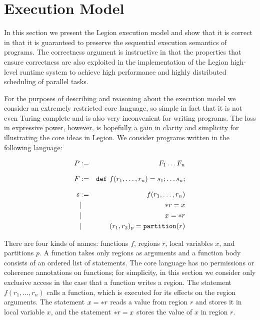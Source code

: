 
\section{Execution Model}
\label{sec:exec}

In this section we present the Legion execution model and show that
it is correct in that it is guaranteed to preserve the sequential
execution semantics of programs.  The correctness argument is
instructive in that the properties that ensure correctness are also
exploited in the implementation of the Legion high-level runtime
system to achieve high performance and highly distributed scheduling
of parallel tasks.

For the purposes of describing and reasoning about the
execution model we consider an extremely restricted core language, so
simple in fact that it is not even Turing complete and is also very
inconvenient for writing programs.  The loss in expressive power, however,
is hopefully a gain in clarity and simplicity for illustrating the core ideas in
Legion.    We consider programs written in the following language:

\begin{eqnarray*}
P & := & F_1 \ldots F_n \\[.1in]
F & := & \mbox{\tt def}\ f(r_1,\ldots,r_n) =   s_1; \ldots s_n; \\[.1in]
s & := & f(r_1,\ldots,r_n) \\
&| & \ast r = x \\
& | & x = \ast r \\
&| & (r_1, r_2)_{p} = \mbox{\tt partition}(r) \\ 
\end{eqnarray*}

There are four kinds of names: functions $f$, regions $r$, local
variables $x$, and partitions $p$.  A function takes only regions as
arguments and a function body consists of an ordered list of
statements.  The core language has no permissions or coherence annotations
on functions; for simplicity, in this section we consider only exclusive access in the case
that a function writes a region.  The statement $f(r_1,\ldots,r_n)$ calls a function, which
is executed for its effects on the region arguments.  The statement $x
= \ast r$ reads a value from region $r$ and stores it in local
variable $x$, and the statement $\ast r = x$ stores the value of $x$
in region $r$.  

